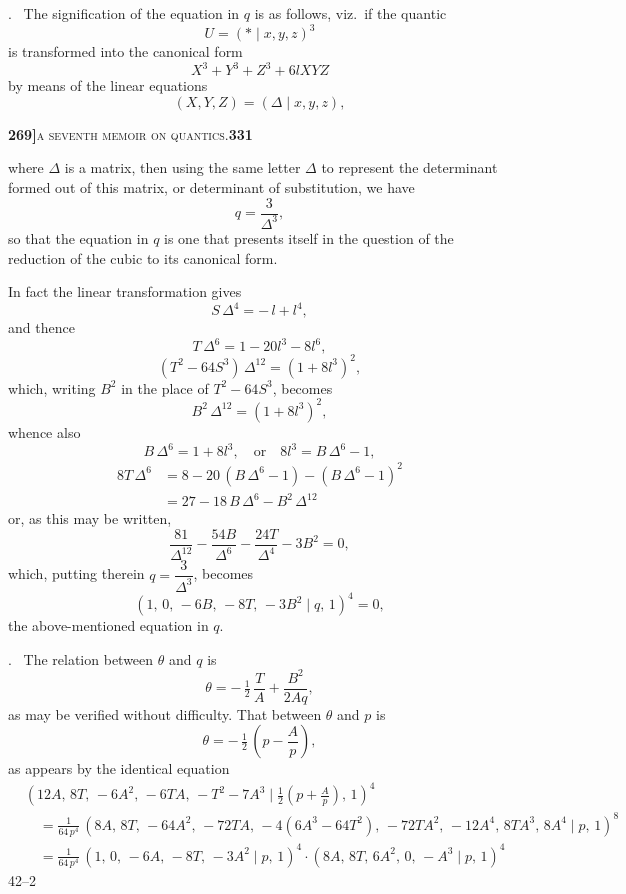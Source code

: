 \documentclass[11pt]{article}
\newcommand{\Cdel}{\mid}
\begin{document}
\medskip

. \ The signification of the equation in $q$ is as follows, viz.\ if the quantic
\[
   U = (*\Cdel x, y, z)^3
\]
is transformed into the canonical form
\[
   X^3 + Y^3 + Z^3 + 6 l X Y Z
\]
by means of the linear equations
\[
   (X, Y, Z) = (\Delta\Cdel x, y, z),
\]

\newpage
\setcounter{page}{331}

\noindent\textbf{269]}\hfill\textsc{a seventh memoir on quantics.}\hfill\textbf{331}

\medskip

\noindent where $\Delta$ is a matrix, then using the same letter $\Delta$ to represent the determinant formed out of this matrix, or determinant of substitution, we have
\[
   q = \frac{3}{\Delta^3},
\]
so that the equation in $q$ is one that presents itself in the question of the reduction of the cubic to its canonical form.

\medskip

\noindent In fact the linear transformation gives
\[
   S\,\Delta^4 = -\,l + l^4,
\]
and thence
\[
   T\,\Delta^6 = 1 - 20 l^3 - 8 l^6,
\]
\[
   (T^2 - 64 S^3)\,\Delta^{12} = (1 + 8 l^3)^2,
\]
which, writing $B^2$ in the place of $T^2 - 64 S^3$, becomes
\[
   B^2\,\Delta^{12} = (1 + 8 l^3)^2,
\]
whence also
\[
   B\,\Delta^6 = 1 + 8 l^3,\quad\text{or}\quad 8 l^3 = B\,\Delta^6 - 1,
\]
\[
\begin{aligned}
   8 T\,\Delta^6 &= 8 - 20\,(B\,\Delta^6 - 1) - (B\,\Delta^6 - 1)^2\\
   &= 27 - 18\,B\,\Delta^6 - B^2\,\Delta^{12}
\end{aligned}
\]
or, as this may be written,
\[
   \frac{81}{\Delta^{12}} - \frac{54 B}{\Delta^6} - \frac{24 T}{\Delta^4} - 3 B^2 = 0,
\]
which, putting therein $q = \dfrac{3}{\Delta^3}$, becomes
\[
   (1,\,0,\,-6 B,\,-8 T,\,-3 B^2\Cdel q,\,1)^4 = 0,
\]
the above-mentioned equation in $q$.

\medskip

. \ The relation between $\theta$ and $q$ is
\[
   \theta = -\,\tfrac{1}{2}\,\frac{T}{A} + \frac{B^2}{2 A q},
\]
as may be verified without difficulty. That between $\theta$ and $p$ is
\[
   \theta = -\,\tfrac{1}{2}\,\left(p - \frac{A}{p}\right),
\]
as appears by the identical equation
\[
\begin{aligned}
&(12 A,\,8 T,\,-6 A^2,\,-6 T A,\,-T^2 - 7 A^3\Cdel\tfrac{1}{2}(p + \tfrac{A}{p}),\,1)^4\\
&\quad = \tfrac{1}{64\,p^4}\,(8 A,\,8 T,\,-64 A^2,\,-72 T A,\,-4(6 A^3 - 64 T^2),\,-72 T A^2,\,-12 A^4,\,8 T A^3,\,8 A^4\Cdel p,\,1)^8\\
&\quad = \tfrac{1}{64\,p^4}\,(1,\,0,\,-6 A,\,-8 T,\,-3 A^2\Cdel p,\,1)^4\cdot(8 A,\,8 T,\,6 A^2,\,0,\,-A^3\Cdel p,\,1)^4
\end{aligned}
\]
\hfill 42--2
\end{document}
